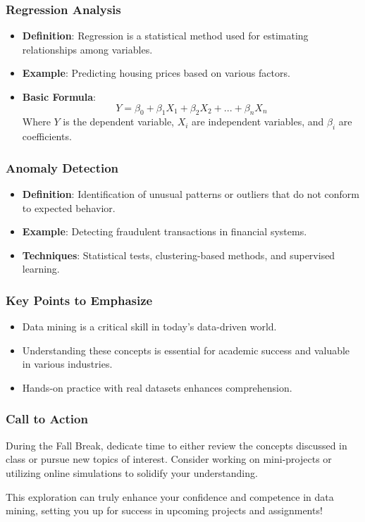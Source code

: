 \documentclass[aspectratio=169]{beamer}
\begin{document}
\begin{frame}[fragile]
    \frametitle{Regression Analysis}
    \begin{itemize}
        \item \textbf{Definition}: Regression is a statistical method used for estimating relationships among variables.
        \item \textbf{Example}: Predicting housing prices based on various factors.
        \item \textbf{Basic Formula}:
            \begin{equation}
            Y = \beta_0 + \beta_1X_1 + \beta_2X_2 + ... + \beta_nX_n
            \end{equation}
            Where \( Y \) is the dependent variable, \( X_i \) are independent variables, and \( \beta_i \) are coefficients.
    \end{itemize}
\end{frame}

\begin{frame}[fragile]
    \frametitle{Anomaly Detection}
    \begin{itemize}
        \item \textbf{Definition}: Identification of unusual patterns or outliers that do not conform to expected behavior.
        \item \textbf{Example}: Detecting fraudulent transactions in financial systems.
        \item \textbf{Techniques}: Statistical tests, clustering-based methods, and supervised learning.
    \end{itemize}
\end{frame}

\begin{frame}[fragile]
    \frametitle{Key Points to Emphasize}
    \begin{itemize}
        \item Data mining is a critical skill in today's data-driven world.
        \item Understanding these concepts is essential for academic success and valuable in various industries.
        \item Hands-on practice with real datasets enhances comprehension.
    \end{itemize}
\end{frame}

\begin{frame}[fragile]
    \frametitle{Call to Action}
    During the Fall Break, dedicate time to either review the concepts discussed in class or pursue new topics of interest. Consider working on mini-projects or utilizing online simulations to solidify your understanding. 

    This exploration can truly enhance your confidence and competence in data mining, setting you up for success in upcoming projects and assignments!
\end{frame}
\end{document}
